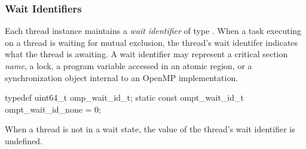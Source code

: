 \subsubsection{Wait Identifiers}

\label{sec:omp_wait_id_t}

Each thread instance maintains a \emph{wait identifier} of type .
When a task executing on a thread is waiting for mutual exclusion, the thread's wait identifer indicates what the thread is awaiting.
A wait identifier may represent a critical section {\em name}, a lock, a program variable accessed in an atomic region, or a synchronization object internal to an OpenMP implementation.


\begin{ccppspecific}
\begin{omptOther}
typedef uint64_t omp_wait_id_t;
static const ompt_wait_id_t ompt_wait_id_none = 0;
\end{omptOther}
\end{ccppspecific}


When a thread is not in a wait state, the value of the thread's wait identifier is undefined.

